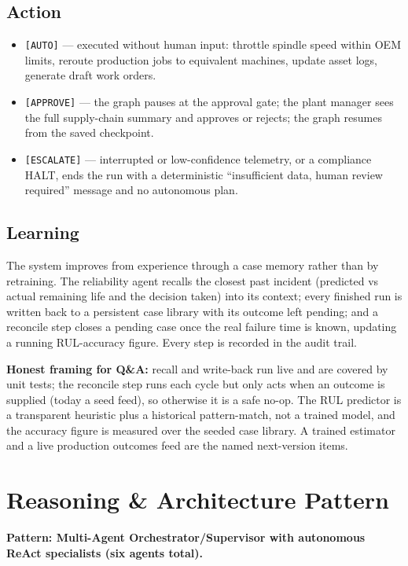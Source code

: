 \documentclass[11pt,a4paper]{article}
\let\oldsection\section
\renewcommand{\section}{\needspace{7\baselineskip}\oldsection}
\let\oldsubsection\subsection
\renewcommand{\subsection}{\needspace{5\baselineskip}\oldsubsection}
\begin{document}
\subsection*{Action}
\begin{itemize}
  \item \texttt{[AUTO]} --- executed without human input: throttle spindle speed within OEM limits, reroute production jobs to equivalent machines, update asset logs, generate draft work orders.
  \item \texttt{[APPROVE]} --- the graph pauses at the approval gate; the plant manager sees the full supply-chain summary and approves or rejects; the graph resumes from the saved checkpoint.
  \item \texttt{[ESCALATE]} --- interrupted or low-confidence telemetry, or a compliance HALT, ends the run with a deterministic ``insufficient data, human review required'' message and no autonomous plan.
\end{itemize}

\subsection*{Learning}
The system improves from experience through a case memory rather than by retraining. The reliability agent recalls the closest past incident (predicted vs actual remaining life and the decision taken) into its context; every finished run is written back to a persistent case library with its outcome left pending; and a reconcile step closes a pending case once the real failure time is known, updating a running RUL-accuracy figure. Every step is recorded in the audit trail.

\textbf{Honest framing for Q\&A:} recall and write-back run live and are covered by unit tests; the reconcile step runs each cycle but only acts when an outcome is supplied (today a seed feed), so otherwise it is a safe no-op. The RUL predictor is a transparent heuristic plus a historical pattern-match, not a trained model, and the accuracy figure is measured over the seeded case library. A trained estimator and a live production outcomes feed are the named next-version items.

\section{Reasoning \& Architecture Pattern}
\textbf{Pattern: Multi-Agent Orchestrator/Supervisor with autonomous ReAct specialists (six agents total).}
\end{document}
